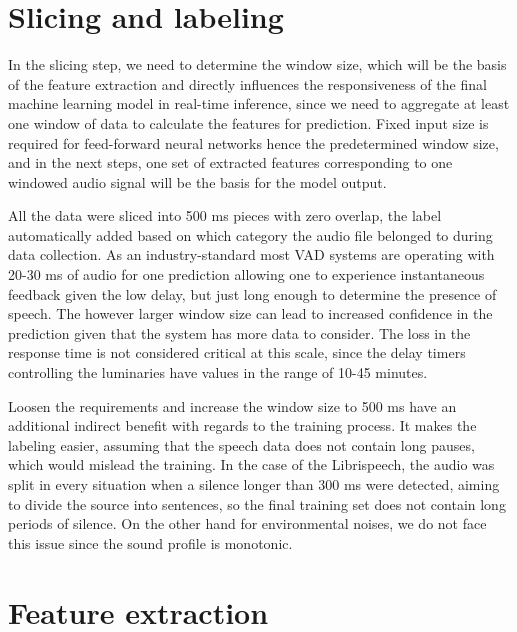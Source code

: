 
\section{Slicing and labeling}

In the slicing step, we need to determine the window size, which will be the basis of the feature extraction and directly influences the responsiveness of the final machine learning model in real-time inference, since we need to aggregate at least one window of data to calculate the features for prediction. Fixed input size is required for feed-forward neural networks hence the predetermined window size, and in the next steps, one set of extracted features corresponding to one windowed audio signal will be the basis for the model output.

All the data were sliced into 500 ms pieces with zero overlap, the label automatically added based on which category the audio file belonged to during data collection. As an industry-standard most VAD systems are operating with 20-30 ms of audio for one prediction allowing one to experience instantaneous feedback given the low delay, but just long enough to determine the presence of speech. The however larger window size can lead to increased confidence in the prediction given that the system has more data to consider. The loss in the response time is not considered critical at this scale, since the delay timers controlling the luminaries have values in the range of 10-45 minutes. 

Loosen the requirements and increase the window size to 500 ms have an additional indirect benefit with regards to the training process. It makes the labeling easier, assuming that the speech data does not contain long pauses, which would mislead the training. In the case of the Librispeech, the audio was split in every situation when a silence longer than 300 ms were detected, aiming to divide the source into sentences, so the final training set does not contain long periods of silence. On the other hand for environmental noises, we do not face this issue since the sound profile is monotonic. 

\section{Feature extraction}

